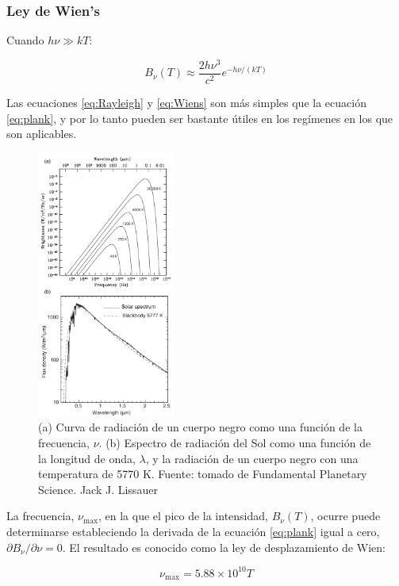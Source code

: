 \documentclass[12pt]{article}
\begin{document}
\subsubsection{Ley de Wien's}
Cuando $h\nu \gg kT$:

\begin{equation}
    B_\nu (T) \approx \frac{2h\nu^3}{c^2} e^{-h\nu/(kT)}
    \label{eq:Wiens}
\end{equation}

Las ecuaciones \ref{eq:Rayleigh} y \ref{eq:Wiens} son más simples que la ecuación \ref{eq:plank}, y por lo tanto 
pueden ser bastante útiles en los regímenes en los que son aplicables.\\
\begin{figure}[H]
    \centering
    \includegraphics[width=0.4\textwidth]{images/waavelength.png}
    \caption{(a) Curva de radiación de un cuerpo negro como una función de la frecuencia, $\nu$.
    (b) Espectro de radiación del Sol como una función de la longitud de onda, $\lambda$, y la radiación de 
    un cuerpo negro con una temperatura de 5770 K. Fuente: tomado de Fundamental Planetary Science. Jack J. Lissauer}
    \label{fig:curva_radiacion}
\end{figure}

La frecuencia, $\nu_{\text{max}}$, en la que el pico de la intensidad, $B_\nu (T)$, ocurre puede determinarse 
estableciendo la derivada de la ecuación \ref{eq:plank} igual a cero, $\partial B_\nu / \partial \nu = 0$. 
El resultado es conocido como la ley de desplazamiento de Wien:

\begin{equation}
    \nu_{\text{max}} = 5.88 \times 10^{10} T
\end{equation}
\end{document}
